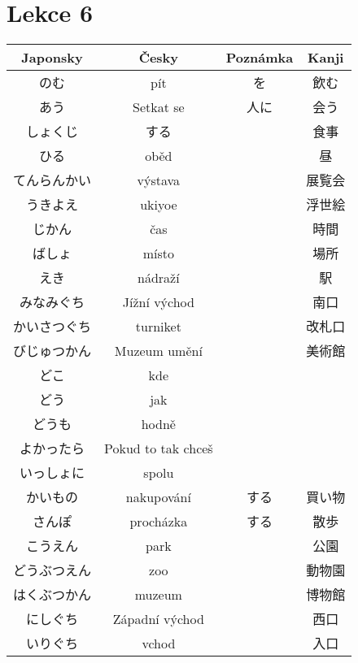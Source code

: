 \section{Lekce 6}
\begin{table}[H]
\centering
\begin{tabular}{cccc}
\hline
Japonsky & Česky                     & Poznámka                   & Kanji \\
\hline
のむ       & pít                & を    & 飲む  \\
あう       & Setkat se          & 人に   & 会う  \\
しょくじ     & する                & & 食事        \\
ひる       & oběd              & & 昼        \\
てんらんかい   & výstava        &    & 展覧会       \\
うきよえ     & ukiyoe           &  & 浮世絵     \\
じかん      & čas               & & 時間    \\
ばしょ      & místo             & & 場所  \\
えき       & nádraží            && 駅      \\
みなみぐち    & Jížní východ    &   & 南口      \\
かいさつぐち   & turniket       &    & 改札口     \\
びじゅつかん   & Muzeum umění   &    & 美術館     \\
どこ       & kde                &      &     \\
どう       & jak                &      &     \\
どうも      & hodně              &      &     \\
よかったら    & Pokud to tak chceš &      &     \\
いっしょに    & spolu              &      &     \\
かいもの     & nakupování         & する   & 買い物 \\
さんぽ      & procházka          & する   & 散歩  \\
こうえん     & park               && 公園        \\
どうぶつえん   & zoo                && 動物園     \\
はくぶつかん   & muzeum          &   & 博物館     \\
にしぐち     & Západní východ   &  & 西口        \\
いりぐち     & vchod            &  & 入口        \\

\end{tabular}
\end{table}
